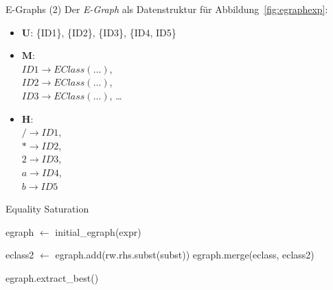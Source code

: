 \begin{frame}{E-Graphs (2)}
Der \textit{E-Graph} als Datenstruktur für Abbildung~\ref{fig:egraphexp}: \vspace{5mm}

\begin{itemize}
\setlength\itemsep{1em}
  \item $\mathbf{U}$: \{ID1\}, \;\; \{ID2\}, \;\; \{ID3\}, \;\; \{ID4, ID5\} 
  \item $\mathbf{M}$: \\ $ID1 \rightarrow EClass(\ldots)$, \\ $ID2 \rightarrow EClass(\ldots)$, \\ $ID3 \rightarrow EClass(\ldots)$, \ldots 
  \item $\mathbf{H}$: \\ $/ \rightarrow ID1$, \\ $* \rightarrow ID2$, \\ $2 \rightarrow ID3$, \\ $a \rightarrow ID4$, \\ $b \rightarrow ID5$
\end{itemize}
\end{frame}

\begin{frame}{Equality Saturation}
    \begin{algorithm}[H]
        \caption{Traditioneller Equality Saturation Workflow nach~\cite{2021-egg}}\label{alg:eqsat} %
        \begin{algorithmic}
          \State egraph $\gets$ initial\_egraph(expr)
            
            
                \State  eclass2 $\gets$ egraph.add(rw.rhs.subst(subst))
                \State egraph.merge(eclass, eclass2)
              \EndFor 
            \EndFor
          \EndWhile
      
          \State \Return egraph.extract\_best()
          \EndFunction
        \end{algorithmic}
    \end{algorithm}
\end{frame}